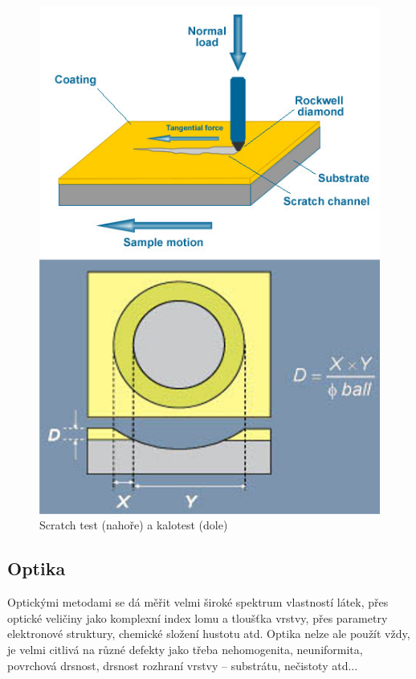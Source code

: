 \documentclass[12pt]{article}
\begin{document}
\begin{figure}[ht]
\begin{minipage}[b]{0.45\linewidth}
\includegraphics[width=\textwidth]{scratchandcalo.jpg}
\caption{Scratch test (nahoře) a kalotest (dole)}
\label{fig:figure2}
\end{minipage}
\end{figure}

\subsection{Optika}
Optickými metodami se dá měřit velmi široké spektrum vlastností látek, přes optické veličiny jako komplexní index lomu a tloušťka vrstvy, přes parametry elektronové struktury, chemické složení hustotu atd. Optika nelze ale použít vždy, je velmi citlivá na různé defekty jako třeba nehomogenita, neuniformita, povrchová drsnost, drsnost rozhraní vrstvy -- substrátu, nečistoty atd... 
\end{document}
